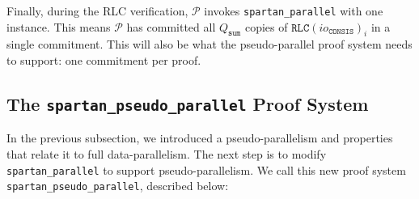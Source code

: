\documentclass{article}
\newcommand{\code}{\texttt}
\newcommand{\Qsum}{Q_{\mathtt{sum}}}
\renewcommand{\P}{\mathcal{P}}
\newcommand{\RLC}{\mathtt{RLC}}
\newcommand{\ioc}{io_{\mathtt{CONSIS}}}
\begin{document}
Finally, during the RLC verification, $\P$ invokes \code{spartan\_parallel} with one instance. This means $\P$ has committed all $\Qsum$ copies of $\RLC(\ioc)_i$ in a single commitment. This will also be what the pseudo-parallel proof system needs to support: one commitment per proof.

\subsection{The \code{spartan\_pseudo\_parallel} Proof System}

In the previous subsection, we introduced a pseudo-parallelism and properties that relate it to full data-parallelism. The next step is to modify \code{spartan\_parallel} to support pseudo-parallelism. We call this new proof system \code{spartan\_pseudo\_parallel}, described below:
\end{document}
